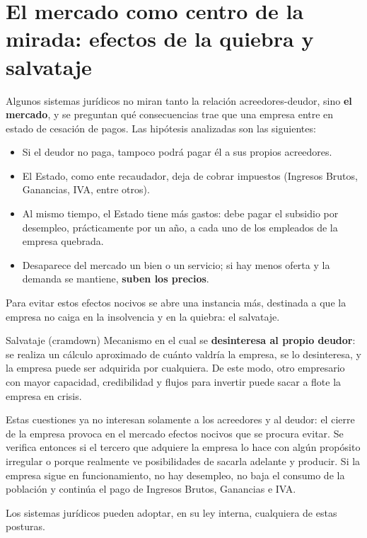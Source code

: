 \documentclass[12pt,oneside]{book}
\begin{document}
\section{El mercado como centro de la mirada: efectos de la quiebra y salvataje}

Algunos sistemas jurídicos no miran tanto la relación acreedores-deudor, sino \textbf{el mercado}, y se preguntan qué consecuencias trae que una empresa entre en estado de cesación de pagos. Las hipótesis analizadas son las siguientes:

\begin{itemize}
    \item Si el deudor no paga, tampoco podrá pagar él a sus propios acreedores.
    \item El Estado, como ente recaudador, deja de cobrar impuestos (Ingresos Brutos, Ganancias, IVA, entre otros).
    \item Al mismo tiempo, el Estado tiene más gastos: debe pagar el subsidio por desempleo, prácticamente por un año, a cada uno de los empleados de la empresa quebrada.
    \item Desaparece del mercado un bien o un servicio; si hay menos oferta y la demanda se mantiene, \textbf{suben los precios}.
\end{itemize}

Para evitar estos efectos nocivos se abre una instancia más, destinada a que la empresa no caiga en la insolvencia y en la quiebra: el salvataje.

\begin{definition}{Salvataje (cramdown)}
Mecanismo en el cual se \textbf{desinteresa al propio deudor}: se realiza un cálculo aproximado de cuánto valdría la empresa, se lo desinteresa, y la empresa puede ser adquirida por cualquiera. De este modo, otro empresario con mayor capacidad, credibilidad y flujos para invertir puede sacar a flote la empresa en crisis.
\end{definition}

Estas cuestiones ya no interesan solamente a los acreedores y al deudor: el cierre de la empresa provoca en el mercado efectos nocivos que se procura evitar. Se verifica entonces si el tercero que adquiere la empresa lo hace con algún propósito irregular o porque realmente ve posibilidades de sacarla adelante y producir. Si la empresa sigue en funcionamiento, no hay desempleo, no baja el consumo de la población y continúa el pago de Ingresos Brutos, Ganancias e IVA.

Los sistemas jurídicos pueden adoptar, en su ley interna, cualquiera de estas posturas.
\end{document}
